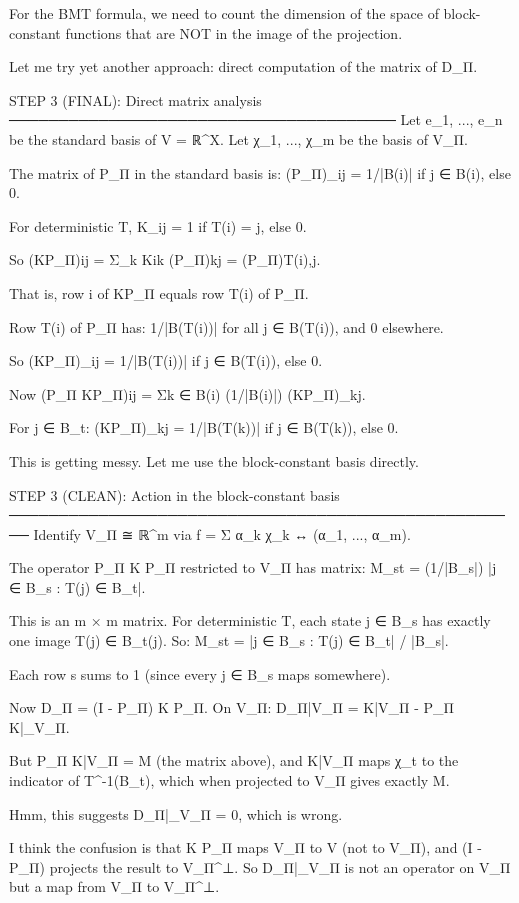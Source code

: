For the BMT formula, we need to count the dimension of the space of
block-constant functions that are NOT in the image of the projection.

Let me try yet another approach: direct computation of the matrix of D_Π.

STEP 3 (FINAL): Direct matrix analysis
───────────────────────────────────────
Let {e_1, ..., e_n} be the standard basis of V = ℝ^X.
Let {χ_1, ..., χ_m} be the basis of V_Π.

The matrix of P_Π in the standard basis is:
(P_Π)_{ij} = 1/|B(i)| if j ∈ B(i), else 0.

For deterministic T, K_{ij} = 1 if T(i) = j, else 0.

So (KP_Π){ij} = Σ_k K{ik} (P_Π){kj} = (P_Π){T(i),j}.

That is, row i of KP_Π equals row T(i) of P_Π.

Row T(i) of P_Π has: 1/|B(T(i))| for all j ∈ B(T(i)), and 0 elsewhere.

So (KP_Π)_{ij} = 1/|B(T(i))| if j ∈ B(T(i)), else 0.

Now (P_Π KP_Π){ij} = Σ{k ∈ B(i)} (1/|B(i)|) (KP_Π)_{kj}.

For j ∈ B_t:
(KP_Π)_{kj} = 1/|B(T(k))| if j ∈ B(T(k)), else 0.

This is getting messy. Let me use the block-constant basis directly.

STEP 3 (CLEAN): Action in the block-constant basis
────────────────────────────────────────────────────
Identify V_Π ≅ ℝ^m via f = Σ α_k χ_k ↔ (α_1, ..., α_m).

The operator P_Π K P_Π restricted to V_Π has matrix:
M_{st} = (1/|B_s|) |{j ∈ B_s : T(j) ∈ B_t}|.

This is an m × m matrix. For deterministic T, each state j ∈ B_s has exactly
one image T(j) ∈ B_{t(j)}. So:
M_{st} = |{j ∈ B_s : T(j) ∈ B_t}| / |B_s|.

Each row s sums to 1 (since every j ∈ B_s maps somewhere).

Now D_Π = (I - P_Π) K P_Π. On V_Π:
D_Π|{V_Π} = K|{V_Π} - P_Π K|_{V_Π}.

But P_Π K|{V_Π} = M (the matrix above), and K|{V_Π} maps χ_t to the
indicator of T^{-1}(B_t), which when projected to V_Π gives exactly M.

Hmm, this suggests D_Π|_{V_Π} = 0, which is wrong.

I think the confusion is that K P_Π maps V_Π to V (not to V_Π), and
(I - P_Π) projects the result to V_Π^⊥. So D_Π|_{V_Π} is not an operator
on V_Π but a map from V_Π to V_Π^⊥.


